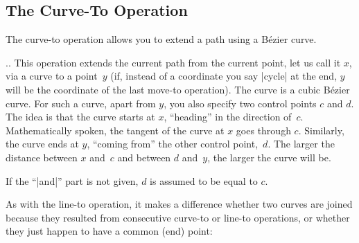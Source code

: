 \subsection{The Curve-To Operation}

The curve-to operation allows you to extend a path using a B\'ezier
curve.

\begin{pathoperation}{..}{}
  This operation extends the current path from the current
  point, let us call it $x$, via a curve to a point~$y$ (if, instead
  of a coordinate you say |cycle| at the end, $y$ will be the
  coordinate of the last move-to operation).
  The curve is a cubic B\'ezier curve. For such a curve,
  apart from $y$, you also specify two control points $c$ and $d$. The
  idea is that the curve starts at $x$, ``heading'' in the direction
  of~$c$. Mathematically spoken, the tangent of the curve at $x$ goes
  through $c$. Similarly, the curve ends at $y$, ``coming from'' the
  other control point,~$d$. The larger the distance between $x$ and~$c$
  and between $d$ and~$y$, the larger the curve will be.

  If the ``|and|'' part is not given, $d$ is assumed to be
  equal to $c$.

\begin{codeexample}[]
\end{codeexample}

\begin{codeexample}[]
\end{codeexample}

  As with the line-to operation, it makes a difference whether two curves
  are joined because they resulted from consecutive curve-to or line-to
  operations, or whether they just happen to have a common (end) point:

\begin{codeexample}[]
\end{codeexample}
\end{pathoperation}



